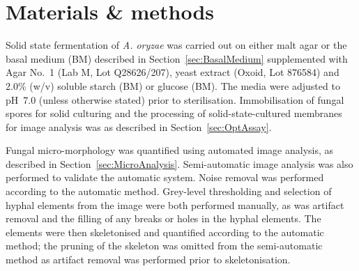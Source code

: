 \section{Materials \& methods}

Solid state fermentation of \emph{A. oryzae} was carried out on either malt agar or the basal medium (BM) described in Section~\ref{sec:BasalMedium} supplemented with  Agar No.~1 (Lab M, Lot Q28626/207),  yeast extract (Oxoid, Lot 876584) and 2.0\% (w/v) soluble starch (BM) or glucose (BM). The media were adjusted to pH~7.0 (unless otherwise stated) prior to sterilisation. Immobilisation of fungal spores for solid culturing and the processing of solid-state-cultured membranes for image analysis was as described in Section~\ref{sec:OptAssay}.

Fungal micro-morphology was quantified using automated image analysis, as described in Section~\ref{sec:MicroAnalysis}. Semi-automatic image analysis was also performed to validate the automatic system. Noise removal was performed according to the automatic method. Grey-level thresholding and selection of hyphal elements from the image were both performed manually, as was artifact removal and the filling of any breaks or holes in the hyphal elements. The elements were then skeletonised and quantified according to the automatic method; the pruning of the skeleton was omitted from the semi-automatic method as artifact removal was performed prior to skeletonisation.